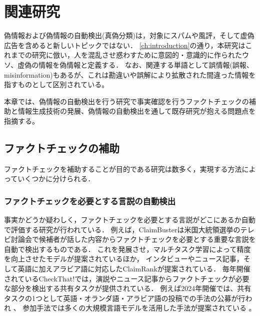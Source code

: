 \chapter{関連研究}\label{ch:rel_res}

偽情報および偽情報の自動検出(真偽分類)は，対象にスパム\cite{shen2017discovering}や風評\cite{7023340}，そして虚偽広告\cite{Huang:2017:DFO:3041021.3054233}を含めると新しいトピックではない．
\cref{ch:introduction}の通り，本研究はこれまでの研究\cite{Born2017-11-02,Shu:2017:FND:3137597.3137600,Ruchansky:2017:CHD:3132847.3132877,Wang:2018:EEA:3219819.3219903}に倣い，人を混乱させ惑わすために意図的・意識的に作られたウソ、虚偽の情報を偽情報と定義する．
なお、関連する単語として誤情報(誤報、misinformation)もあるが、これは勘違いや誤解により拡散された間違った情報を指すものとして区別されている\cite{Born2017-11-02,gov2024}。

本章では、偽情報の自動検出を行う研究で事実確認を行うファクトチェックの補助と情報生成技術の発展、偽情報の自動検出を通して既存研究が抱える問題点を指摘する。


\section{ファクトチェックの補助}
ファクトチェックを補助することが目的である研究は数多く，実現する方法によっていくつかに分けられる．

\subsection{ファクトチェックを必要とする言説の自動検出}
事実かどうか疑わしく，ファクトチェックを必要とする言説がどこにあるか自動で評価する研究が行われている．
例えば，ClaimBusterは米国大統領選挙のテレビ討論会で候補者が話した内容からファクトチェックを必要とする重要な言説を自動で検出するものである\cite{10.1145/2806416.2806652}．
これを発展させ，マルチタスク学習によって精度を向上させたモデル\cite{vasileva-etal-2019-takes}が提案されているほか，
インタビューやニュース記事，そして英語に加えアラビア語に対応したClaimRank\cite{jaradat-etal-2018-claimrank}が提案されている．
毎年開催されているCheckThat!では，演説やニュース記事からファクトチェックが必要な部分を検出する共有タスクが提供されている\cite{10.1007/978-3-030-45442-5_65}．
例えば2024年開催では、共有タスクの1つとして英語・オランダ語・アラビア語の投稿での手法の公募が行われ \cite{hasanain2024overview}、
参加手法では多くの大規模言語モデルを活用した手法が提案されている \cite{gruman2024clac,golik2024dshacker,li2024factfinderscheckthat2024refining,roysland2024iai,aguilera2024sinai,bulut2024turquaz}。

